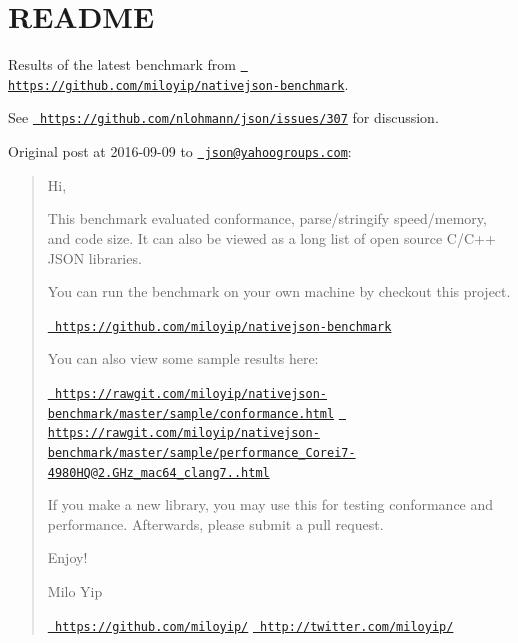 \chapter{README}
\hypertarget{md_build_2dt__core_2__deps_2nlohmann__json-src_2tests_2reports_22016-09-09-nativejson__benchmark_2README}{}\label{md_build_2dt__core_2__deps_2nlohmann__json-src_2tests_2reports_22016-09-09-nativejson__benchmark_2README}
Results of the latest benchmark from \href{https://github.com/miloyip/nativejson-benchmark}{\texttt{ https\+://github.\+com/miloyip/nativejson-\/benchmark}}.

See \href{https://github.com/nlohmann/json/issues/307}{\texttt{ https\+://github.\+com/nlohmann/json/issues/307}} for discussion.

Original post at 2016-\/09-\/09 to \href{mailto:json@yahoogroups.com}{\texttt{ json@yahoogroups.\+com}}\+:

\begin{quote}
Hi,

This benchmark evaluated conformance, parse/stringify speed/memory, and code size. It can also be viewed as a long list of open source C/\+C++ JSON libraries.

You can run the benchmark on your own machine by checkout this project.

\href{https://github.com/miloyip/nativejson-benchmark}{\texttt{ https\+://github.\+com/miloyip/nativejson-\/benchmark}}

You can also view some sample results here\+:

\href{https://rawgit.com/miloyip/nativejson-benchmark/master/sample/conformance.html}{\texttt{ https\+://rawgit.\+com/miloyip/nativejson-\/benchmark/master/sample/conformance.\+html}} \href{https://rawgit.com/miloyip/nativejson-benchmark/master/sample/performance_Corei7-4980HQ@2.80GHz_mac64_clang7.0.html}{\texttt{ https\+://rawgit.\+com/miloyip/nativejson-\/benchmark/master/sample/performance\+\_\+\+Corei7-\/4980\+HQ@2.\+GHz\+\_\+mac64\+\_\+clang7..\+html}}

If you make a new library, you may use this for testing conformance and performance. Afterwards, please submit a pull request.

Enjoy!

 Milo Yip

\href{https://github.com/miloyip/}{\texttt{ https\+://github.\+com/miloyip/}} \href{http://twitter.com/miloyip/}{\texttt{ http\+://twitter.\+com/miloyip/}} \end{quote}
